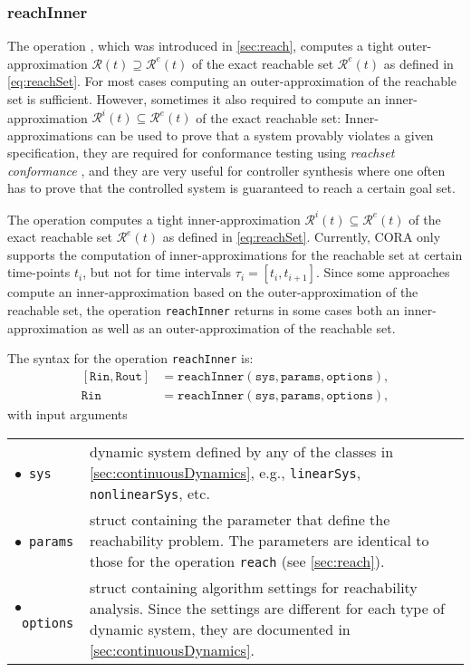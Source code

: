 \subsubsection{reachInner} \label{sec:reachInner}

The operation , which was introduced in \cref{sec:reach}, computes a tight outer-approximation $\mathcal{R}(t) \supseteq \mathcal{R}^e(t)$ of the exact reachable set $\mathcal{R}^e(t)$ as defined in \eqref{eq:reachSet}. For most cases computing an outer-approximation of the reachable set is sufficient. However, sometimes it also required to compute an inner-approximation $\mathcal{R}^i(t) \subseteq \mathcal{R}^e(t)$ of the exact reachable set: Inner-approximations can be used to prove that a system provably violates a given specification, they are required for conformance testing using \textit{reachset conformance} \cite{Roehm2016}, and they are very useful for controller synthesis where one often has to prove that the controlled system is guaranteed to reach a certain goal set.

The operation  computes a tight inner-approximation $\mathcal{R}^i(t) \subseteq \mathcal{R}^e(t)$ of the exact reachable set $\mathcal{R}^e(t)$ as defined in \eqref{eq:reachSet}. Currently, CORA only supports the computation of inner-approximations for the reachable set at certain time-points $t_i$, but not for time intervals $\tau_i = [t_i,t_{i+1}]$. Since some approaches compute an inner-approximation based on the outer-approximation of the reachable set, the operation \texttt{reachInner} returns in some cases both an inner-approximation as well as an outer-approximation of the reachable set.

The syntax for the operation \texttt{reachInner} is:
\begin{equation*}
	\begin{split}
		[\texttt{Rin},\texttt{Rout}] &= \texttt{reachInner}(\texttt{sys},\texttt{params},\texttt{options}), \\
		\texttt{Rin} &= \texttt{reachInner}(\texttt{sys},\texttt{params},\texttt{options}),
	\end{split}
\end{equation*}
with input arguments

\begin{center}
\renewcommand{\arraystretch}{1.3}
\begin{tabular}[t]{l p{13cm} }
	$\bullet$~\texttt{sys} & dynamic system defined by any of the classes in \cref{sec:continuousDynamics}, e.g., \texttt{linearSys}, \texttt{nonlinearSys}, etc. \\
	$\bullet$~\texttt{params} & struct containing the parameter that define the reachability problem. The parameters are identical to those for the operation \texttt{reach} (see \cref{sec:reach}). \\
	$\bullet$~\texttt{options} & struct containing algorithm settings for reachability analysis. Since the settings are different for each type of dynamic system, they are documented in \cref{sec:continuousDynamics}.
\end{tabular}
\end{center}

